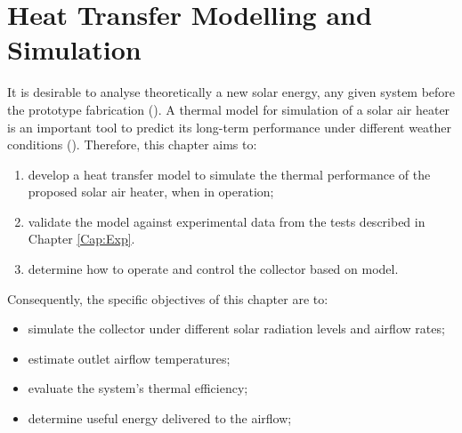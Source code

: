 \chapter{Heat Transfer Modelling and Simulation}
\label{Cap:Thermal}


It is desirable to analyse theoretically a new solar energy, any given system before the prototype fabrication (\cite{Tchinda2008}). A thermal model for simulation of a solar air heater is an important tool to predict its long-term performance under different weather conditions (\cite{Shams2013}). Therefore, this chapter aims to: 

\begin{enumerate}[topsep=5pt,partopsep=0pt] \itemsep0pt
	\item develop a heat transfer model to simulate the thermal performance of the proposed solar air heater, when in operation;
	\item validate the model against experimental data from the tests described in Chapter \ref{Cap:Exp}.
	\item determine how to operate and control the collector based on model.
\end{enumerate}


Consequently, the specific objectives of this chapter are to:

\begin{itemize}[topsep=5pt,partopsep=0pt] \itemsep0pt
	\item simulate the collector under different solar radiation levels and airflow rates;
	\item estimate outlet airflow temperatures;
	\item evaluate the system's thermal efficiency;
	\item determine useful energy delivered to the airflow;
\end{itemize}

